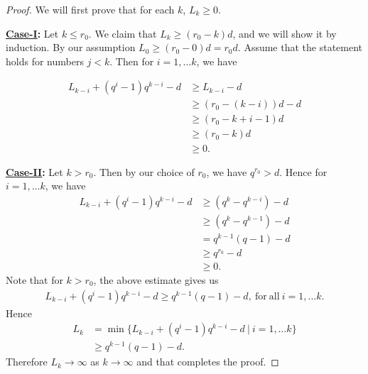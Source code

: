 \documentclass[10pt,a4paper]{amsart}
\begin{document}
\begin{proof}
We will first prove that for each $k$, $L_{k}\geq 0$.

\noindent \textbf{\underline{Case-I}:} Let $k\leq r_{0}$. We claim that $L_{k}\geq (r_{0}-k)d$, and we will show it by induction. By our assumption $L_{0}\geq (r_{0}-0)d=r_{0}d$. Assume that the statement holds for numbers $j<k$. Then for $i=1,\ldots k$, we have 

\begin{align*}
L_{k-i}+(q^{i}-1)q^{k-i}-d &\geq L_{k-i}-d\\
&\geq (r_{0}-(k-i))d-d\\
&\geq (r_{0}-k+i-1)d\\
&\geq (r_{0}-k)d\\
&\geq 0.
\end{align*}
  
\noindent\textbf{\underline{Case-II}:} Let $k> r_{0}$. Then by our choice of $r_{0}$, we have $q^{r_{0}}>d$. Hence for $i=1,\ldots k$, we have 
\begin{align*}
L_{k-i}+(q^{i}-1)q^{k-i}-d&\geq (q^{k}-q^{k-i})-d\\
&\geq (q^{k}-q^{k-1})-d\\
&= q^{k-1}(q-1)-d\\
&\geq q^{r_{0}}-d\\
&\geq  0.
\end{align*}
Note that for $k>r_{0}$, the above estimate gives us
\begin{align*}
L_{k-i}+(q^{i}-1)q^{k-i}-d\geq q^{k-1}(q-1)-d,~ \mathrm{for~ all}~ i=1,\ldots k.
\end{align*}
Hence 
\begin{align*}
L_{k}&=\min \{L_{k-i}+(q^{i}-1)q^{k-i}-d ~|~ i=1,\ldots k\}\\
&\geq q^{k-1}(q-1)-d.
\end{align*}
Therefore $L_{k}\rightarrow \infty$ as $k\rightarrow \infty$ and that completes the proof.
\end{proof}
\end{document}
